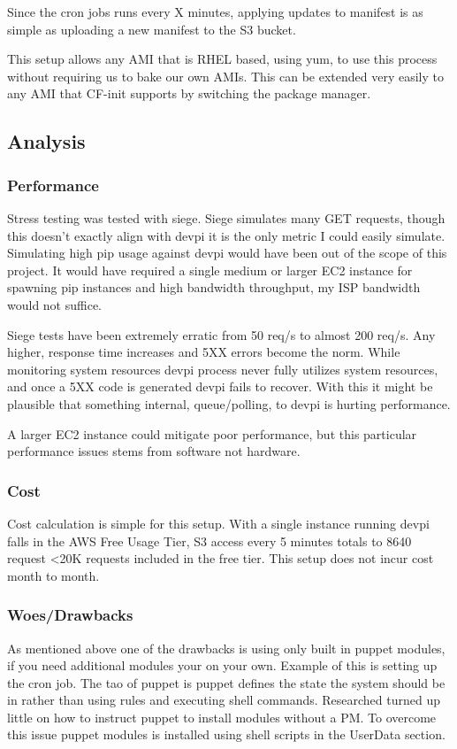 \documentclass[12pt, letterpaper]{article}
\begin{document}
Since the cron jobs runs every X minutes, applying updates to manifest is as simple as uploading a new manifest to the S3 bucket.

This setup allows any AMI that is RHEL based, using yum, to use this process without requiring us to bake our own AMIs. This can
be extended very easily to any AMI that CF-init supports by switching the package manager.


\subsection{Analysis}
\subsubsection{Performance}
Stress testing was tested with siege. Siege simulates many GET requests, though this doesn't exactly align with devpi it is the only 
metric I could easily simulate. Simulating high pip usage against devpi would have been out of the scope of this project. It
would have required a single medium or larger EC2 instance for spawning pip instances and high bandwidth throughput, my ISP bandwidth
would not suffice.

Siege tests have been extremely erratic from 50 req/s to almost 200 req/s. Any higher, response time increases and 5XX errors become
the norm. While monitoring system resources devpi process never fully utilizes system resources, and once a 5XX code is generated 
devpi fails to recover. With this it might be plausible that something internal, queue/polling, to devpi is hurting performance.

A larger EC2 instance could mitigate poor performance, but this particular performance issues stems from software not hardware.

\subsubsection{Cost}
Cost calculation is simple for this setup. With a single instance running devpi falls in the AWS Free Usage Tier, S3 access every
5 minutes totals to 8640 request \textless 20K requests included in the free tier. This setup does not incur cost month to month.

\subsubsection{Woes/Drawbacks}
As mentioned above one of the drawbacks is using only built in puppet modules, if you need additional modules your on your own. 
Example of this is setting up the cron job. The tao of puppet is puppet defines the state the system should
be in rather than using rules and executing shell commands. Researched turned up little on how to instruct puppet to install modules
without a PM. To overcome this issue puppet modules is installed using shell scripts in the UserData section.
\end{document}
